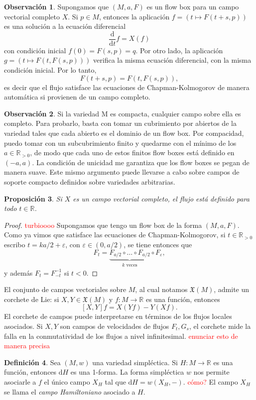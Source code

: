 \documentclass[11pt, a4paper]{article}
\newcommand{\RR}{\mathbb{R}}
\newcommand{\XX}{\mathfrak{X}}
\newcommand{\dd}{\mathrm{d}}
\newcommand{\ddt}{\frac{\dd}{\dd t}}
\theoremstyle{plain}
\newtheorem{prop}{Proposición}[section]
\theoremstyle{definition}
\newtheorem{defn}[prop]{Definición}
\newtheorem{obs}[prop]{Observación}
\begin{document}
\begin{obs} Supongamos que $(M,a,F)$ es un flow box para un campo vectorial completo $X$. Si $p\in M$, entonces la aplicación $f=(t\mapsto F(t+s,p))$ es una solución a la ecuación diferencial
\[\ddt f = X(f)\]
con condición inicial $f(0)=F(s,p)=q$. Por otro lado, la aplicación $g=(t\mapsto F(t,F(s,p)))$ verifica la misma ecuación diferencial, con la misma condición inicial. Por lo tanto,
\[F(t+s, p) = F(t,F(s,p)),\]
es decir que el flujo satisface las ecuaciones de Chapman-Kolmogorov de manera automática si provienen de un campo completo.
\end{obs}
\begin{obs} Si la variedad M es compacta, cualquier campo sobre ella es completo. Para probarlo, basta con tomar un cubrimiento por abiertos de la variedad tales que cada abierto es el dominio de un flow box. Por compacidad, puedo tomar con un subcubrimiento finito y quedarme con el mínimo de los $a\in \RR_{>0}$, de modo que cada uno de estos finitos flow boxes está definido en $(-a,a)$. La condición de unicidad me garantiza que los flow boxes se pegan de manera suave. Este mismo argumento puede llevarse a cabo sobre campos de soporte compacto definidos sobre variedades arbitrarias.
\end{obs}
\begin{prop} Si $X$ es un campo vectorial completo, el flujo está definido para todo $t\in \RR$.
\end{prop}
\begin{proof} \textcolor{red}{turbioooo} Supongamos que tengo un flow box de la forma $(M,a,F)$. Como ya vimos que satisface las ecuaciones de Chapman-Kolmogorov, si $t\in\RR_{>0}$ escribo $t=ka/2 + \varepsilon$, con $\varepsilon \in (0,a/2)$, se tiene entonces que
\[F_t = \underbrace{F_{a/2}\circ\dots\circ F_{a/2}}_{\substack{\text{$k$ veces}}}\circ F_\varepsilon,\]
y además $F_t = F_{-t}^{-1}$ si $t<0$.
\end{proof}
El conjunto de campos vectoriales sobre $M$, al cual notamos $\XX(M)$, admite un corchete de Lie: si $X,Y\in \XX(M)$ y $f:M\to \RR$ es una función, entonces
\[[X,Y]f = X(Yf) - Y(Xf).\]
El corchete de campos puede interpretarse en términos de los flujos locales asociados. Si $X, Y$ son campos de velocidades de flujos $F_t, G_s$, el corchete mide la falla en la conmutatividad de los flujos a nivel infinitesimal. \textcolor{red}{enunciar esto de manera precisa}

\begin{defn} Sea $(M,w)$ una variedad simpléctica. Si $H:M\to \RR$ es una función, entonces $\dd H$ es una 1-forma. La forma simpléctica $w$ nos permite asociarle a $f$ el único campo $X_H$ tal que $\dd H = w(X_H, -)$. \textcolor{red}{cómo?} El campo $X_H$ se llama el \emph{campo Hamiltoniano} asociado a $H$.
\end{defn}
\end{document}
